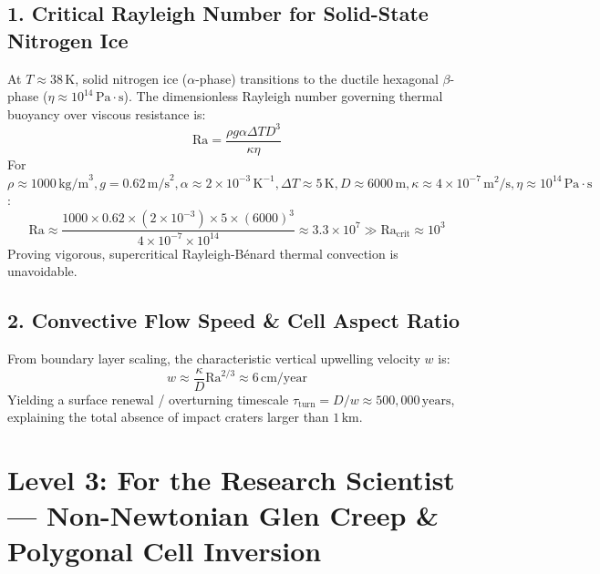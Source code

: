 \documentclass[11pt,a4paper]{article}
\begin{document}
\subsection*{1. Critical Rayleigh Number for Solid-State Nitrogen Ice}
At $T \approx 38\,\text{K}$, solid nitrogen ice ($\alpha$-phase) transitions to the ductile hexagonal $\beta$-phase ($\eta \approx 10^{14}\,\text{Pa}\cdot\text{s}$). The dimensionless Rayleigh number governing thermal buoyancy over viscous resistance is:
\begin{equation}
\mathrm{Ra} = \frac{\rho g \alpha \Delta T D^3}{\kappa \eta}
\end{equation}
For $\rho \approx 1000\,\text{kg/m}^3, g = 0.62\,\text{m/s}^2, \alpha \approx 2 \times 10^{-3}\,\text{K}^{-1}, \Delta T \approx 5\,\text{K}, D \approx 6000\,\text{m}, \kappa \approx 4 \times 10^{-7}\,\text{m}^2/\text{s}, \eta \approx 10^{14}\,\text{Pa}\cdot\text{s}$:
\begin{equation}
\mathrm{Ra} \approx \frac{1000 \times 0.62 \times (2 \times 10^{-3}) \times 5 \times (6000)^3}{4 \times 10^{-7} \times 10^{14}} \approx 3.3 \times 10^7 \gg \mathrm{Ra}_{\text{crit}} \approx 10^3
\end{equation}
Proving vigorous, supercritical Rayleigh-Bénard thermal convection is unavoidable.

\subsection*{2. Convective Flow Speed \& Cell Aspect Ratio}
From boundary layer scaling, the characteristic vertical upwelling velocity $w$ is:
\begin{equation}
w \approx \frac{\kappa}{D} \mathrm{Ra}^{2/3} \approx 6\,\text{cm/year}
\end{equation}
Yielding a surface renewal / overturning timescale $\tau_{\text{turn}} = D / w \approx 500,000\,\text{years}$, explaining the total absence of impact craters larger than $1\,\text{km}$.

\newpage

\section*{Level 3: For the Research Scientist — Non-Newtonian Glen Creep \& Polygonal Cell Inversion}
\end{document}
